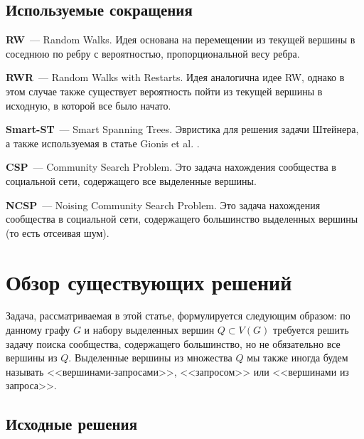 \subsection{Используемые сокращения}

\textbf{RW}~--- Random Walks. Идея основана на перемещении из текущей вершины в соседнюю по ребру с вероятностью, пропорциональной весу ребра.

\textbf{RWR}~--- Random Walks with Restarts. Идея аналогична идее RW, однако в этом случае также существует вероятность пойти из текущей вершины в исходную, в которой все было начато.

\textbf{Smart-ST}~--- Smart Spanning Trees. Эвристика для решения задачи Штейнера, а также используемая в статье Gionis et al. \cite{Gionis15}.

\textbf{CSP}~--- Community Search Problem. Это задача нахождения сообщества в социальной сети, содержащего все выделенные вершины.

\textbf{NCSP}~--- Noising Community Search Problem. Это задача нахождения сообщества в социальной сети, содержащего большинство выделенных вершины (то есть отсеивая шум).

\section{Обзор существующих решений}

Задача, рассматриваемая в этой статье, формулируется следующим образом: по данному графу $G$ и набору выделенных вершин $Q \subset V(G)$ требуется решить задачу поиска сообщества, содержащего большинство, но не обязательно все вершины из $Q$. Выделенные вершины из множества $Q$ мы также иногда будем называть <<вершинами-запросами>>, <<запросом>> или <<вершинами из запроса>>.

\subsection{Исходные решения}

